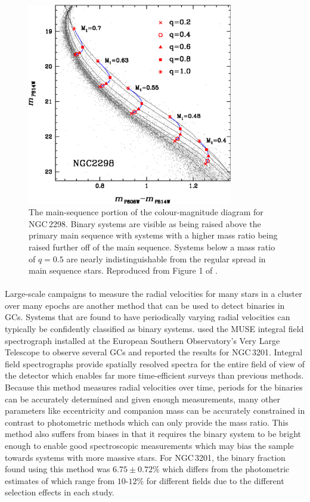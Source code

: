 \begin{figure}
	\centering
	\includegraphics[width=0.8\textwidth]{./figures/main_sequence_binaries.pdf}
	\caption{The main-sequence portion of the colour-magnitude diagram for NGC\,2298. Binary
		systems are visible as being raised above the primary main sequence with systems
		with a higher mass ratio being raised further off of the main sequence. Systems
		below a mass ratio of $q=0.5$ are nearly indistinguishable from the regular spread
		in main sequence stars. Reproduced from Figure 1 of \citet{Milone2012}.}
	\label{fig:1/main_sequence_binaries}
\end{figure}

\paragraph{}
Large-scale campaigns to measure the radial velocities for many stars in a cluster over many epochs
are another method that can be used to detect binaries in GCs. Systems that are found to have
periodically varying radial velocities can typically be confidently classified as binary systems.
\citet{Giesers2019} used the MUSE integral field spectrograph installed at the European Southern
Observatory's Very Large Telescope to observe several GCs and reported the results for NGC\,3201.
Integral field spectrographs provide spatially resolved spectra for the entire field of view of the
detector which enables far more time-efficient surveys than previous methods. Because this method
measures radial velocities over time, periods for the binaries can be accurately determined and
given enough measurements, many other parameters like eccentricity and companion mass can be
accurately constrained in contrast to photometric methods which can only provide the mass ratio.
This method also suffers from biases in that it requires the binary system to be bright enough to
enable good spectroscopic measurements which may bias the sample towards systems with more massive
stars. For NGC\,3201, the binary fraction found using this method was $6.75 \pm 0.72 \%$
\citep{Giesers2019} which differs from the photometric estimates of \citet{Milone2012} which range
from $10\textrm{-}12\%$ for different fields due to the different selection effects in each study.


